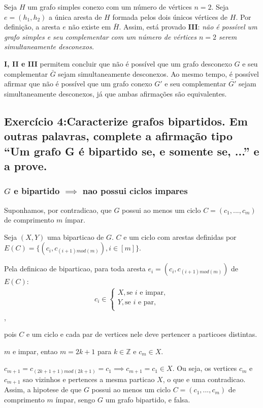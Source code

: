 \documentclass{article}
\begin{document}
Seja $H$ um grafo simples conexo com um número de vértices $n = 2$. Seja $e = (h_1, h_2)$ a única aresta de $H$ formada pelos dois únicos vértices de $H$. Por definição, a aresta $e$ não existe em $\bar{H}$. Assim, está provado \textbf{III}: \textit{não é possível um grafo simples e seu complementar com um número de vértices $n = 2$ serem simultaneamente desconexos.}

\textbf{I, II e III} permitem concluir que não é possível que um grafo desconexo $G$ e seu complementar $\bar{G}$ sejam simultaneamente desconexos. Ao mesmo tempo, é possível afirmar que não é possível que um grafo conexo $G'$ e seu complementar $\bar{G'}$ sejam simultaneamente desconexos, já que ambas afirmações são equivalentes.
 
 \clearpage
 
 
 \subsection{Exercício 4:Caracterize grafos bipartidos. Em outras palavras, complete a afirmação tipo “Um grafo G é bipartido se, e somente se, ...” e a prove.}
 
\subsubsection{$G$ e bipartido $\implies$ nao possui ciclos impares}
 
 
 Suponhamos, por contradicao, que $G$ possui ao menos um ciclo $C = (c_1, ..., c_m)$ de comprimento $m$ ímpar.
 
 Seja $(X,Y)$ uma biparticao de $G$. $C$ e um ciclo com arestas definidas por $E(C) = \{(c_i, c_{(i+1)mod(m)}), i \in [m]\}$.
 
Pela definicao de biparticao, para toda aresta $e_i = (c_i, c_{(i+1)mod(m)})$ de $E(C)$:
\begin{align}
	c_i \in 
	\begin{cases} 
		X, \text{se     } i \text{     e impar}, \\
		Y, \text{se     } i \text{     e par}, \\
	\end{cases}
\end{align},

pois $C$ e um ciclo e cada par de vertices nele deve pertencer a particoes distintas.

$m$ e impar, entao $m = 2k + 1$ para $k \in \mathbb{Z}$ e $c_m \in X$. 

$c_{m+1} = c_{(2k + 1 + 1)mod(2k+1) } = c_1 \implies c_{m+1} = c_1 \in X$. Ou seja, os vertices $c_m$ e $c_{m+1}$ sao vizinhos e pertences a mesma particao $X$, o que e uma contradicao. Assim, a hipotese de que $G$ possui ao menos um ciclo $C = (c_1, ..., c_m)$ de comprimento $m$ ímpar, sengo $G$ um grafo bipartido, e falsa.
\end{document}
